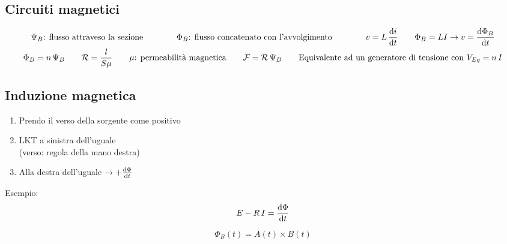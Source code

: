 \documentclass[10pt]{article}
\begin{document}
    \vspace{-3\baselineskip}
    \subsection*{Circuiti magnetici}
    \vspace{-1.5\baselineskip}

        \begin{gather*}
            \Psi_B \text{: flusso attraveso la sezione} \qquad\qquad \Phi_B \text{: flusso concatenato con l'avvolgimento} \qquad\qquad v = L \, \dv{i}{t} \qquad \Phi_B = L I \rightarrow v = \dv{\Phi_B}{t}\\
            \Phi_B = n \, \Psi_B \qquad \mathcal{R} = \frac{l}{S \mu} \qquad \mu \text{: permeabilità magnetica} \qquad \mathcal{F} = \mathcal{R} \, \Psi_B \qquad \text{Equivalente ad un generatore di tensione con } V_{Eq} = n \, I
        \end{gather*}

    \vspace{-1.5\baselineskip}
    \subsection*{Induzione magnetica}

        \begin{minipage}[t]{.4\textwidth}
            \vspace{-2cm}

            \begin{enumerate}
                \item Prendo il verso della sorgente come positivo
                \item LKT a sinistra dell'uguale\\(verso: regola della mano destra)
                \item Alla destra dell'uguale \(\rightarrow + \dv{\Phi}{t}\)
            \end{enumerate}

        \end{minipage}
        \hspace{1cm}
        \begin{minipage}[t]{.1\textwidth}
            \vspace{-1.75cm}

            Esempio: 
            \[
                E - R \, I = \dv{\Phi}{t}
            \]

        \end{minipage}
        \hspace{1cm}
        \begin{minipage}[t]{.1\textwidth}

            

        \end{minipage}
        \hspace{.5cm}
        \begin{minipage}[t]{.3\textwidth}
            \vspace{-1.3cm}
            
            \[
                \Phi_B (t) = A(t) \times B(t)
            \]

        \end{minipage}
\end{document}
